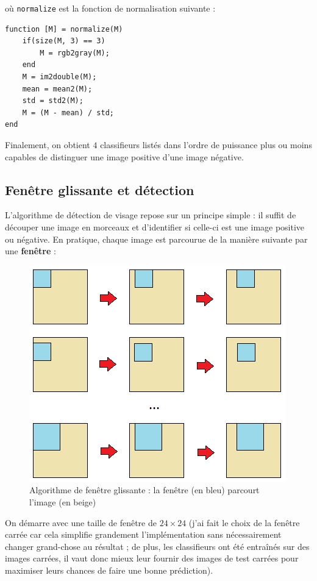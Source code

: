 \documentclass[11pt]{report}
\begin{document}
où \verb|normalize| est la fonction de normalisation suivante : 

\begin{lstlisting}
function [M] = normalize(M)
    if(size(M, 3) == 3)
        M = rgb2gray(M);
    end
    M = im2double(M);
    mean = mean2(M);
    std = std2(M);
    M = (M - mean) / std;
end
\end{lstlisting}

Finalement, on obtient $4$ classifieurs listés dans l'ordre de puissance plus ou moins capables de distinguer une image positive d'une image négative.

\newpage
\subsection*{Fenêtre glissante et détection}

L'algorithme de détection de visage repose sur un principe simple : il suffit de découper une image en morceaux et d'identifier si celle-ci est une image positive ou négative. En pratique, chaque image est parcourue de la manière suivante par une \textbf{fenêtre} : 

\begin{figure}[h]
\centering
\includegraphics{image/fenetre-glissante.png}
\cprotect\caption{Algorithme de fenêtre glissante : la fenêtre (en bleu) parcourt l'image (en beige)}
\end{figure}

On démarre avec une taille de fenêtre de $24 \times 24$ (j'ai fait le choix de la fenêtre carrée car cela simplifie grandement l'implémentation sans nécessairement changer grand-chose au résultat ; de plus, les classifieurs ont été entraînés sur des images carrées, il vaut donc mieux leur fournir des images de test carrées pour maximiser leurs chances de faire une bonne prédiction). 
\end{document}
